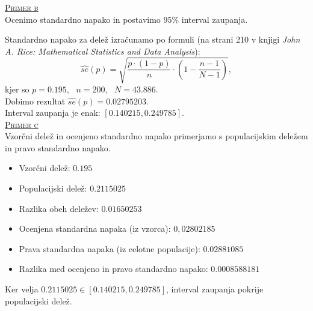 \documentclass[a4paper,12pt]{article}
\begin{document}

\noindent
\textsc{\underline{Primer b}}
\\
Ocenimo standardno napako in postavimo 95\% interval zaupanja.

\noindent
Standardno napako za delež izračunamo po formuli (na strani 210 v knjigi \textit{John A. Rice: Mathematical Statistics and Data Analysis}):
$$ \hat{se}(p) = \sqrt{ \frac{p \cdot (1-p)}{n} \cdot \left(1 - \frac{n - 1}{N - 1} \right)}, $$
kjer so $p = 0.195$, \ $n = 200$, \ $N = 43.886$. 
\\
Dobimo rezultat $\hat{se}(p) = 0.02795203$.
\\
Interval zaupanja je enak: $[0.140215, 0.249785]$.
\\


\noindent
\textsc{\underline{Primer c}}
\\
Vzorčni delež in ocenjeno standardno napako primerjamo s populacijskim deležem in pravo standardno napako. 
\\
\begin{itemize}
\item Vzorčni delež: $0.195$ 
\item Populacijski delež: $0.2115025$ 
\item Razlika obeh deležev: $0.01650253$
\item Ocenjena standardna napaka (iz vzorca): $0,02802185$
\item Prava standardna napaka (iz celotne populacije):  $0.02881085$
\item Razlika med ocenjeno in pravo standardno napako: $0.0008588181$
\end{itemize}
Ker velja $0.2115025 \in [0.140215, 0.249785]$, interval zaupanja pokrije populacijski delež.
\\

\end{document}
